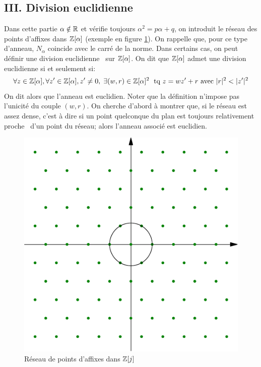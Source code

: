 \subsection*{III. Division euclidienne}
Dans cette partie $\alpha \notin \mathbb{R}$ et vérifie toujours $\alpha^2 = p \alpha + q$, on introduit le réseau des points d'affixes dans $\mathbb{Z}[\alpha]$ (exemple en figure \ref{fig:Eanneauxquad_1}). On rappelle que, pour ce type d'anneau, $N_{\alpha}$ coincide avec le carré de la norme.\newline
Dans certains cas, on peut définir une \og division euclidienne\fg~ sur $\mathbb{Z}[\alpha]$.\newline
On dit que $\mathbb{Z}[\alpha]$ admet une division euclidienne si et seulement si:
\begin{displaymath}
\forall z\in \mathbb{Z}[\alpha], \forall z'\in \mathbb{Z}[\alpha], z'\neq 0,\; \exists (w,r)\in \mathbb{Z}[\alpha]^2 \;\text{ tq }
z = wz' + r \text{ avec } |r|^2 < |z'|^2
\end{displaymath}
On dit alors que l'anneau est euclidien. Noter que la définition n'impose pas l'unicité du couple $(w,r)$.\newline
On cherche d'abord à montrer que, si le réseau est assez dense, c'est à dire si un point quelconque du plan est toujours relativement \og proche\fg~ d'un point du réseau; alors l'anneau associé est euclidien. 

\begin{figure}[h]
  \centering
  \includegraphics{./Eanneauxquad_1.pdf}
  \caption{Réseau de points d'affixes dans $\mathbb{Z}[j]$}
  \label{fig:Eanneauxquad_1}
\end{figure}

